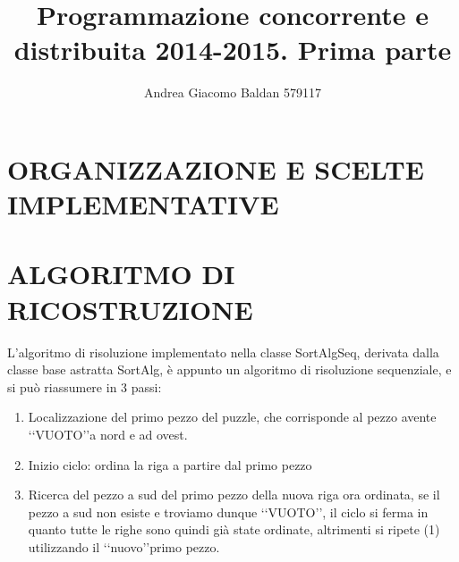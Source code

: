 \documentclass[10pt,a4paper]{article}
\title{Programmazione concorrente e distribuita 2014-2015. Prima parte}
\author{Andrea Giacomo Baldan 579117}
\begin{document}
\maketitle
\begingroup
\let\clearpage\relax
\section*{ORGANIZZAZIONE E SCELTE IMPLEMENTATIVE}
\section*{ALGORITMO DI RICOSTRUZIONE}
L'algoritmo di risoluzione implementato nella classe SortAlgSeq, derivata dalla classe base astratta SortAlg, è appunto un algoritmo di risoluzione sequenziale, e si può riassumere in 3 passi:
\begin{enumerate}
    \item
    Localizzazione del primo pezzo del puzzle, che corrisponde al pezzo avente \lq\lq VUOTO\rq\rq a nord e ad ovest.
    \item
    Inizio ciclo: ordina la riga a partire dal primo pezzo
    \item
    Ricerca del pezzo a sud del primo pezzo della nuova riga ora ordinata, se il pezzo a sud non esiste e troviamo dunque \lq\lq VUOTO\rq\rq, il ciclo si ferma in quanto tutte le righe sono quindi già state ordinate, altrimenti si ripete (1) utilizzando il \lq\lq nuovo\rq\rq primo pezzo.
\end{enumerate}
\endgroup
\end{document}
